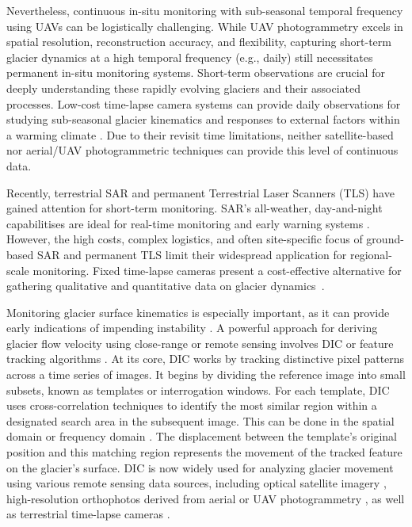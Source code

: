 Nevertheless, continuous in-situ monitoring with sub-seasonal temporal frequency using UAVs can be logistically challenging.
While UAV photogrammetry excels in spatial resolution, reconstruction accuracy, and flexibility, capturing short-term glacier dynamics at a high temporal frequency (e.g., daily) still necessitates permanent in-situ monitoring systems. 
Short-term observations are crucial for deeply understanding these rapidly evolving glaciers and their associated processes.
Low-cost time-lapse camera systems can provide daily observations for studying sub-seasonal glacier kinematics and responses to external factors within a warming climate \cite{Messerli2015}.  
Due to their revisit time limitations, neither satellite-based nor aerial/UAV photogrammetric techniques can provide this level of continuous data.

Recently, terrestrial SAR \cite{Luzi2007} and permanent Terrestrial Laser Scanners (TLS) \cite{Hendrickx2022, Voordendag2023} have gained attention for short-term monitoring. 
SAR's all-weather, day-and-night capabilitises are ideal for real-time monitoring and early warning systems \citep{Noferini2009, Dematteis2017_sar}. 
However, the high costs, complex logistics, and often site-specific focus of ground-based SAR and permanent TLS limit their widespread application for regional-scale monitoring.
Fixed time-lapse cameras present a cost-effective alternative for gathering qualitative and quantitative data on glacier dynamics~\citep{Maas2006, Messerli2015, Giordan2016, James2016}.

Monitoring glacier surface kinematics is especially important, as it can provide early indications of impending instability \citep{Faillettaz2015}.
A powerful approach for deriving glacier flow velocity using close-range or remote sensing involves DIC or feature tracking algorithms \cite{ahn_box_2010, Giordan2016, Hadhri2019}.
At its core, DIC works by tracking distinctive pixel patterns across a time series of images.
It begins by dividing the reference image into small subsets, known as templates or interrogation windows. 
For each template, DIC uses cross-correlation techniques to identify the most similar region within a designated search area in the subsequent image.
This can be done in the spatial domain \citep{Scambos1992} or frequency domain \citep{rolstad1997}.
The displacement between the template’s original position and this matching region represents the movement of the tracked feature on the glacier's surface.
DIC is now widely used for analyzing glacier movement using various remote sensing data sources, including optical satellite imagery \citep{Scambos1992, Scherler2008, Heid2012_evaluation_xcorr}, high-resolution orthophotos derived from aerial or UAV photogrammetry \citep{immerzeel2014, Chudley2019, ioli2021mid}, as well as terrestrial time-lapse cameras \cite{Messerli2015, Giordan2016}. 

